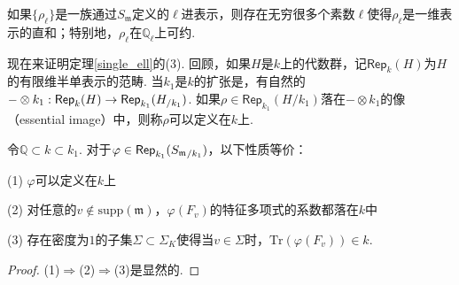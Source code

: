 \begin{ccor}
    如果$\{\rho_{\ell}\}$是一族通过$S_{\mathfrak{m}}$定义的$\ell$进表示，则存在无穷很多个素数$\ell$使得$\rho_{\ell}$是一维表示的直和；特别地，$\rho_{\ell}$在$\mathbb{Q}_{\ell}$上可约.\label{sm_to_reducile}
\end{ccor}

现在来证明定理\ref{single_ell}的(3). 回顾，如果$H$是$k$上的代数群，记$\mathsf{Rep}_k(H)$为$H$的有限维半单表示的范畴. 当$k_1$是$k$的扩张是，有自然的$-\otimes k_1: \mathsf{Rep}_k(H)\to \mathsf{Rep}_{k_1}({H}_{/k_1})$. 如果$\rho\in \mathsf{Rep}_{k_1}(H/k_1)$落在$-\otimes k_1$的像（essential image）中，则称$\rho$可以定义在$k$上.

\begin{cprop}
    令$\mathbb{Q}\subset k\subset k_1$. 对于$\varphi\in \mathsf{Rep}_{k_1}({S_{\mathfrak{m}}}_{/k_1})$，以下性质等价：

    (1) $\varphi$可以定义在$k$上

    (2) 对任意的$v\not\in \mathrm{supp}(\mathfrak{m})$，$\varphi(F_v)$的特征多项式的系数都落在$k$中

    (3) 存在密度为$1$的子集$\Sigma \subset \Sigma_K$使得当$v\in \Sigma$时，$\mathrm{Tr}(\varphi(F_v))\in k$.
\end{cprop}

\begin{proof}
    (1)$\Rightarrow$(2)$\Rightarrow$(3)是显然的.
\end{proof}
